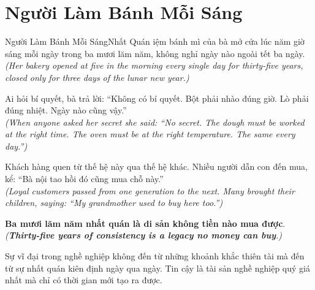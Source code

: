 \section{Người Làm Bánh Mỗi Sáng}
\begin{truyen}{Người Làm Bánh Mỗi Sáng}{Nhất Quán}
iệm bánh mì của bà mở cửa lúc năm giờ sáng mỗi ngày trong ba mươi lăm năm, không nghỉ ngày nào ngoài tết ba ngày.\\
\textit{(Her bakery opened at five in the morning every single day for thirty-five years, closed only for three days of the lunar new year.)}

Ai hỏi bí quyết, bà trả lời: ``Không có bí quyết. Bột phải nhào đúng giờ. Lò phải đúng nhiệt. Ngày nào cũng vậy.''\\
\textit{(When anyone asked her secret she said: ``No secret. The dough must be worked at the right time. The oven must be at the right temperature. The same every day.'')}

Khách hàng quen từ thế hệ này qua thế hệ khác. Nhiều người dẫn con đến mua, kể: ``Bà nội tao hồi đó cũng mua chỗ này.''\\
\textit{(Loyal customers passed from one generation to the next. Many brought their children, saying: ``My grandmother used to buy here too.'')}

\textbf{Ba mươi lăm năm nhất quán là di sản không tiền nào mua được}.\\
\textit{(\textbf{Thirty-five years of consistency is a legacy no money can buy}.)}
\end{truyen}
\begin{baihoc}
  Sự vĩ đại trong nghề nghiệp không đến từ những khoảnh khắc thiên tài mà đến từ sự nhất quán kiên định ngày qua ngày. Tin cậy là tài sản nghề nghiệp quý giá nhất mà chỉ có thời gian mới tạo ra được.
\end{baihoc}

